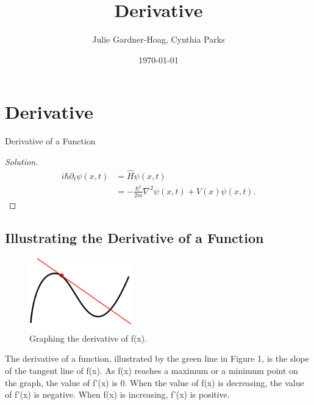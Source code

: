 \documentclass[aps,pra,notitlepage,amsmath,amssymb,letterpaper,12pt]{revtex4-1}
\newenvironment{problem}[2][Problem]{\begin{trivlist}
\item[\hskip \labelsep {\bfseries #1}\hskip \labelsep {\bfseries #2.}]}{\end{trivlist}}
\newenvironment{solution}{\begin{proof}[Solution]}{\end{proof}}
\begin{document}
 
\title{Derivative}
\author{Julie Gardner-Hoag, Cynthia Parks}
\date{\today}

\maketitle

\section{Derivative} %

\begin{problem}{x.yz} 
Derivative of a Function
\end{problem}
 
\begin{solution} %

\begin{align}
i\hbar \partial_t \psi(x,t) &= \hat{H}\psi(x,t) \\
&= -\frac{\hbar^2}{2m}\nabla^2\psi(x,t) + V(x)\psi(x,t). \nonumber
\end{align}
\end{solution}

\subsection{Illustrating the Derivative of a Function} %


\begin{figure}[h!] %
  \includegraphics[width=0.4\textwidth]{derivative.png}  %
  \caption{Graphing the derivative of f(x).}
  \label{fig:figlabel}
\end{figure}

The derivative of a function, illustrated by the green line in Figure 1\cite{wyzant}, is the slope of the tangent line of f(x). As f(x) reaches a maximum or a minimum point on the graph, the value of f'(x) is 0. When the value of f(x) is decreasing, the value of f'(x) is negative. When f(x) is increasing, f'(x) is positive.
\end{document}
